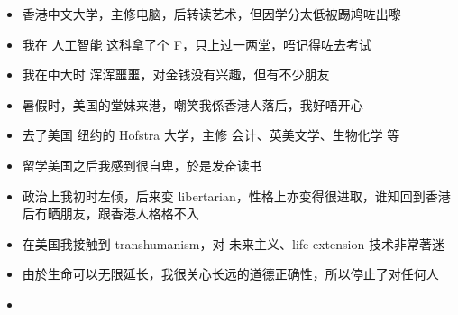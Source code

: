 	\begin{itemize}
		\item 香港中文大学，主修电脑，后转读艺术，但因学分太低被踢鸠咗出嚟
		\item 我在 人工智能 这科拿了个 F，只上过一两堂，唔记得咗去考试
		\item 我在中大时 浑浑噩噩，对金钱没有兴趣，但有不少朋友
		\item 暑假时，美国的堂妹来港，嘲笑我係香港人落后，我好唔开心
		\item 去了美国 纽约的 Hofstra 大学，主修 会计、英美文学、生物化学 等
		\item 留学美国之后我感到很自卑，於是发奋读书
		\item 政治上我初时左倾，后来变 libertarian，性格上亦变得很进取，谁知回到香港后冇晒朋友，跟香港人格格不入
	\end{itemize}


\fontsize{12pt}{7.2}\selectfont
	\begin{itemize}
		\item 在美国我接触到 transhumanism，对 未来主义、life extension 技术非常著迷

		\item 由於生命可以无限延长，我很关心长远的道德正确性，所以停止了对任何人 

		\item 
	\end{itemize}

 